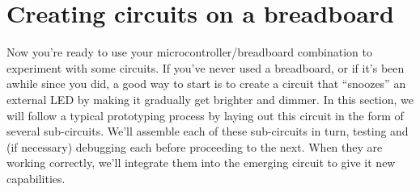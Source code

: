 \section{Creating circuits on a breadboard}
Now you're ready to use your microcontroller/breadboard combination to experiment with some circuits.
If you've never used a breadboard, or if it’s been awhile since you did, a good way to start is to create a circuit that ``snoozes'' an external LED by making it gradually get brighter and dimmer.
In this section, we will follow a typical prototyping process by laying out this circuit in the form of several sub-circuits.
We'll assemble each of these sub-circuits in turn, testing and (if necessary) debugging each before proceeding to the next.
When they are working correctly, we'll integrate them into the emerging circuit to give it new capabilities.

